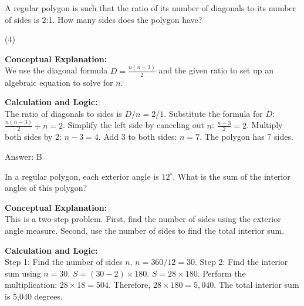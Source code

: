 \documentclass[11pt,paper=a4,answers]{exam}
\begin{document}
\begin{questions}
\vspace{60pt}

\question
A regular polygon is such that the ratio of its number of diagonals to its number of sides is 2:1. How many sides does the polygon have?
\begin{tasks}(4)
\end{tasks}

\begin{solution}
\textbf{Conceptual Explanation:} \\
We use the diagonal formula $D = \frac{n(n-3)}{2}$ and the given ratio to set up an algebraic equation to solve for $n$.

\vspace{30pt}

\textbf{Calculation and Logic:} \\
The ratio of diagonals to sides is $D/n = 2/1$. Substitute the formula for $D$: $\frac{n(n-3)}{2} \div n = 2$. Simplify the left side by canceling out $n$: $\frac{n-3}{2} = 2$. Multiply both sides by 2: $n - 3 = 4$. Add 3 to both sides: $n = 7$. The polygon has 7 sides.

\vspace{30pt}

Answer: \colorbox{yellow!100}{B}
\end{solution}

\vspace{60pt}

\question
In a regular polygon, each exterior angle is $12^\circ$. What is the sum of the interior angles of this polygon?

\begin{solution}
\textbf{Conceptual Explanation:} \\
This is a two-step problem. First, find the number of sides using the exterior angle measure. Second, use the number of sides to find the total interior sum.

\vspace{30pt}

\textbf{Calculation and Logic:} \\
Step 1: Find the number of sides $n$. $n = 360 / 12 = 30$. Step 2: Find the interior sum using $n = 30$. $S = (30 - 2) \times 180$. $S = 28 \times 180$. Perform the multiplication: $28 \times 18 = 504$. Therefore, $28 \times 180 = 5,040$. The total interior sum is 5,040 degrees.


\end{solution}
\end{questions}
\end{document}
